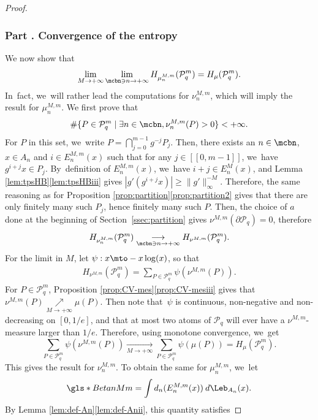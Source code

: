 \begin{proof}
\label{part2}
\subsubsection*{Part \thesubsubsection. Convergence of the entropy}

We now show that
\[
\lim_{M \to +\infty} \lim_{\mcbn \ni n \to +\infty} H_{\mu_n^{M,m}}(\mathcal{P}_q^{m}) = H_{\mu}(\mathcal{P}_q^m).
\]
In~fact, we~will rather lead the computations for $\nu_n^{M,m}$, which will imply the result for $\mu_n^{M,m}$.
We first prove that
\[
\# \{ P \in \mathcal{P}_q^{m} \mid \exists n \in \mcbn, \nu_n^{M,m}(P) > 0 \} < +\infty.
\]
For $P$ in this set, we~write $P = \bigcap_{j = 0}^{m-1} g^{-j} P_j$.
Then, there exists an $n \in \mcbn$, $x \in A_n$ and $i \in E_n^{M,m}(x)$ such that for any $j \in [\![ 0, m-1 ]\!]$, we~have $g^{i+j} x \in P_j$. By~definition of $E_n^{M,m}(x)$, we~have $i+j \in E_n^M(x)$, and Lemma \ref{lem:tpsHB}\eqref{lem:tpsHBiii} gives
$|g'(g^{i+j} x)| \geq \| g' \|_{\infty}^{-M}$.
Therefore, the same reasoning as for Proposition \ref{prop:partition}\eqref{prop:partition2} gives that there are only finitely many such $P_j$, hence finitely many such $P$.
Then, the choice of $a$ done at the beginning of Section~\ref{ssec:partition} gives $\nu^{M,m}(\partial \mathcal{P}_q) = 0$, therefore
\[
H_{\nu_n^{M,m}}(\mathcal{P}_q^{m}) \underset{\mcbn \ni n \to +\infty}{\longrightarrow} H_{\nu^{M,m}}(\mathcal{P}_q^m).
\]
For the limit in $M$, let $\psi : x \mto - x \log(x)$, so that
\begin{align*}
H_{\nu^{M,m}}(\mathcal{P}_q^{m})
= \sum_{P \in \mathcal{P}_q^{m}} \psi(\nu^{M,m}(P)).
\end{align*}
For $P \in \mathcal{P}_q^m$, Proposition \ref{prop:CV-mes}\eqref{prop:CV-mesiii} gives that $\nu^{M,m}(P) \!\underset{M \to +\infty}{\nearrow}\! \mu(P)$.
Then note that~$\psi$ is continuous, non-negative and non-decreasing on $[0, 1/e]$, and that at most two atoms of $\mathcal{P}_q$ will ever have a $\nu^{M,m}$-measure larger than $1/e$.
Therefore, using monotone convergence, we~get\vspace*{-3pt}
\[
\sum_{P \in \mathcal{P}_q^{m}} \psi(\nu^{M,m}(P)) \underset{M \to +\infty}{\longrightarrow} \sum_{P \in \mathcal{P}_q^{m}} \psi(\mu(P))
= H_{\mu}(\mathcal{P}_q^m).
\]
This gives the result for $\nu_n^{M,m}$. To obtain the same for $\mu_n^{M,m}$, we~let
\[
\gls*{BetanMm} = \int d_n(E_n^{M,m}(x)) \: d \Leb_{A_n}(x).
\]
By Lemma \ref{lem:def-An}\eqref{lem:def-Anii}, this quantity satisfies\vspace*{-3pt}

\end{proof}
